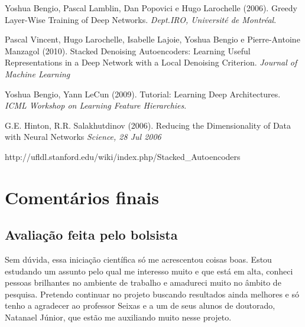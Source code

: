 \documentclass[]{report}
\begin{document}
	\begin{thebibliography}{9}
		Yoshua Bengio, Pascal Lamblin, Dan Popovici e Hugo Larochelle (2006).
		Greedy Layer-Wise Training of Deep Networks.
		\textit{Dept.IRO, Université de Montréal}.
		
		Pascal Vincent, Hugo Larochelle, Isabelle Lajoie, Yoshua Bengio e Pierre-Antoine Manzagol (2010).
		Stacked Denoising Autoencoders: Learning Useful Representations in a Deep Network with a Local Denoising Criterion.
		\textit{Journal of Machine Learning}
		
		Yoshua Bengio, Yann LeCun (2009). 
		Tutorial: Learning Deep Architectures. 
		\textit{ICML Workshop on Learning Feature Hierarchies}.
		
		G.E. Hinton, R.R. Salakhutdinov (2006).
		Reducing the Dimensionality of Data with Neural Networks
		\textit{Science, 28 Jul 2006}
		
		http://ufldl.stanford.edu/wiki/index.php/Stacked\_Autoencoders
	\end{thebibliography}
	
	\chapter*{Comentários finais}
		\section*{Avaliação feita pelo bolsista}
		Sem dúvida, essa iniciação científica só me acrescentou coisas boas. Estou estudando um assunto pelo qual me interesso muito e que está em alta, conheci pessoas brilhantes no ambiente de trabalho e amadureci muito no âmbito de pesquisa. Pretendo continuar no projeto buscando resultados ainda melhores e só tenho a agradecer ao professor Seixas e a um de seus alunos de doutorado, Natanael Júnior, que estão me auxiliando muito nesse projeto.
		
		
\end{document}
